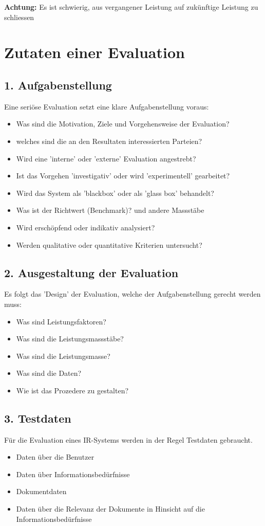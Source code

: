\documentclass{report}
\theoremstyle{definition}
\theoremstyle{example}
\begin{document}
\textbf{Achtung:} Es ist schwierig, aus vergangener Leistung auf zukünftige Leistung zu schliessen


\section{Zutaten einer Evaluation}

\subsection{1. Aufgabenstellung}
Eine seriöse Evaluation setzt eine klare Aufgabenstellung voraus:
\begin{itemize}
   \item Was sind die Motivation, Ziele und Vorgehensweise der Evaluation?
   \item welches sind die an den Resultaten interessierten Parteien?
   \item Wird eine 'interne' oder 'externe' Evaluation angestrebt?
   \item Ist das Vorgehen 'investigativ' oder wird 'experimentell' gearbeitet?
   \item Wird das System als 'blackbox' oder als 'glass box' behandelt?
   \item Was ist der Richtwert (Benchmark)? und andere Massstäbe
   \item Wird erschöpfend oder indikativ analysiert?
   \item Werden qualitative oder quantitative Kriterien untersucht?
\end{itemize}

\subsection{2. Ausgestaltung der Evaluation}
Es folgt das 'Design' der Evaluation, welche der Aufgabenstellung gerecht werden muss:
\begin{itemize}
   \item Was sind Leistungsfaktoren?
   \item Was sind die Leistungsmassstäbe?
   \item Was sind die Leistungsmasse?
   \item Was sind die Daten?
   \item Wie ist das Prozedere zu gestalten?
\end{itemize}

\subsection{3. Testdaten}
Für die Evaluation eines IR-Systems werden in der Regel Testdaten gebraucht. 
\begin{itemize}
   \item Daten über die Benutzer
   \item Daten über Informationsbedürfnisse
   \item Dokumentdaten
   \item Daten über die Relevanz der Dokumente in Hinsicht auf die Informationsbedürfnisse
\end{itemize}
\end{document}
